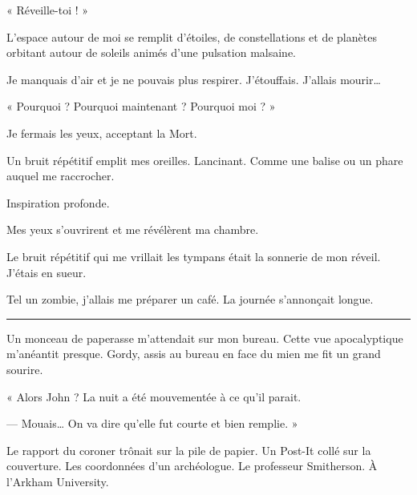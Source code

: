 « Réveille-toi ! »

L'espace autour de moi se remplit d'étoiles, de constellations et de planètes orbitant autour de soleils animés d'une 
pulsation malsaine.

Je manquais d'air et je ne pouvais plus respirer. J'étouffais. J'allais mourir…

« Pourquoi ? Pourquoi maintenant ? Pourquoi moi ? »

Je fermais les yeux, acceptant la Mort.

Un bruit répétitif emplit mes oreilles. Lancinant. Comme une balise ou un phare auquel me raccrocher.

Inspiration profonde.

Mes yeux s'ouvrirent et me révélèrent ma chambre.

Le bruit répétitif qui me vrillait les tympans était la sonnerie de mon réveil. J'étais en sueur.

Tel un zombie, j'allais me préparer un café. La journée s'annonçait longue.

\fancybreak{$* * *$}

Un monceau de paperasse m'attendait sur mon bureau. Cette vue apocalyptique m'anéantit presque. Gordy, assis au bureau 
en face du mien me fit un grand sourire.

« Alors John ? La nuit a été mouvementée à ce qu'il parait.

— Mouais… On va dire qu'elle fut courte et bien remplie. »

Le rapport du coroner trônait sur la pile de papier. Un Post-It collé sur la couverture. Les coordonnées d'un 
archéologue. Le professeur Smitherson. À l'Arkham University.